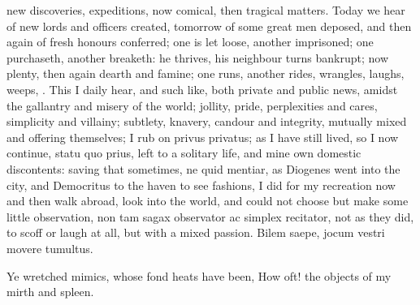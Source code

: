 {new discoveries, expeditions, now comical, then tragical matters. Today
we hear of new lords and officers created, tomorrow of some great men
deposed, and then again of fresh honours conferred; one is let loose,
another imprisoned; one purchaseth, another breaketh: he thrives, his
neighbour turns bankrupt; now plenty, then again dearth and famine; one
runs, another rides, wrangles, laughs, weeps, \etc. This I daily hear,
and such like, both private and public news, amidst the gallantry and
misery of the world; jollity, pride, perplexities and cares, simplicity
and villainy; subtlety, knavery, candour and integrity, mutually mixed
and offering themselves; I rub on privus privatus; as I have still
lived, so I now continue, statu quo prius, left to a solitary life, and
mine own domestic discontents: saving that sometimes, ne quid mentiar,
as Diogenes went into the city, and Democritus to the haven to see
fashions, I did for my recreation now and then walk abroad, look into
the world, and could not choose but make some little observation, non
tam sagax observator ac simplex recitator,  not as they did, to
scoff or laugh at all, but with a mixed passion.
Bilem saepe, jocum vestri movere tumultus.

Ye wretched mimics, whose fond heats have been,
How oft! the objects of my mirth and spleen.

}
